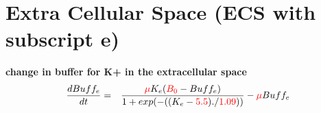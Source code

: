 \documentclass[fleqn]{report}
\numberwithin{equation}{section}
\numberwithin{equation}{section}
\begin{document}
%
%
%
%


	\section{Extra Cellular Space (ECS with subscript e)}
	\textbf{ change in buffer for K+ in the extracellular space}
	\begin{eqnarray}
	 \frac{d Buff_{e}}{dt} &=&   \frac{\textcolor{red}{\mu} K_{e}(\textcolor{red}{B_{0}} - Buff_{e})}{1 + exp(-((K_e - \textcolor{red}{5.5}) ./ \textcolor{red}{1.09}))} - \textcolor{red}{\mu}  Buff_{e}\\
	\end{eqnarray}
	
\end{document}
